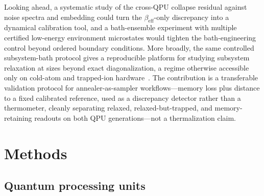 \documentclass[aps,prapplied,reprint,superscriptaddress,floatfix,nofootinbib]{revtex4-2}
\begin{document}
Looking ahead, a systematic study of the cross-QPU collapse residual against noise spectra and embedding could turn the $\beta_\mathrm{eff}$-only discrepancy into a dynamical calibration tool, and a bath-ensemble experiment with multiple certified low-energy environment microstates would tighten the bath-engineering control beyond ordered boundary conditions.
More broadly, the same controlled subsystem-bath protocol gives a reproducible platform for studying subsystem relaxation at sizes beyond exact diagonalization, a regime otherwise accessible only on cold-atom and trapped-ion hardware~\cite{kaufman2016quantum,smith2016mbl,shaw2025ergodicity}.
The contribution is a transferable validation protocol for annealer-as-sampler workflows---memory loss plus distance to a fixed calibrated reference, used as a discrepancy detector rather than a thermometer, cleanly separating relaxed, relaxed-but-trapped, and memory-retaining readouts on both QPU generations---not a thermalization claim.

\section{Methods}

\subsection{Quantum processing units}
\end{document}
